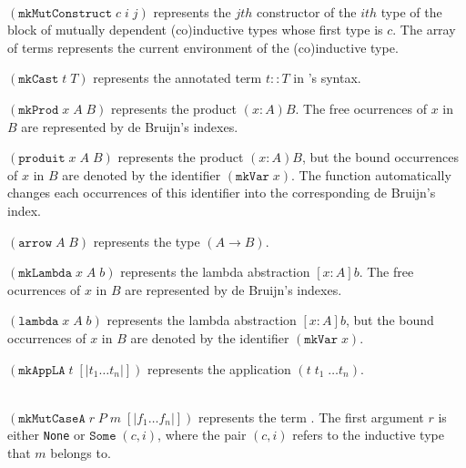\begin{description}
 {\\ $(\texttt{mkMutConstruct}\;c\;i\;j)$ represents the
    $jth$ constructor of the $ith$ type of the block of mutually
    dependent (co)inductive types whose first type is $c$. The array
    of terms represents the current environment of the (co)inductive
    type.}

    {$(\texttt{mkCast}\;t\;T)$ represents the annotated term $t::T$ in
    \Coq's syntax.}  

    {$(\texttt{mkProd}\;x\;A\;B)$ represents the product $(x:A)B$.
     The free ocurrences of $x$ in $B$ are represented by de Bruijn's
     indexes.}

    {$(\texttt{produit}\;x\;A\;B)$ represents the product $(x:A)B$,
     but the bound occurrences of $x$ in $B$ are denoted by 
     the identifier $(\texttt{mkVar}\;x)$. The function automatically 
     changes each occurrences of this identifier into the corresponding 
     de Bruijn's index.}

    {$(\texttt{arrow}\;A\;B)$ represents the type $(A\rightarrow B)$.}

    {$(\texttt{mkLambda}\;x\;A\;b)$ represents the lambda abstraction 
     $[x:A]b$. The free ocurrences of $x$ in $B$ are represented by de Bruijn's
     indexes.}

    {$(\texttt{lambda}\;x\;A\;b)$ represents the lambda abstraction 
     $[x:A]b$, but the bound occurrences of $x$ in $B$ are denoted by 
     the identifier $(\texttt{mkVar}\;x)$. }

    {$(\texttt{mkAppLA}\;t\;[|t_1\ldots t_n|])$ represents the application
    $(t\;t_1\;\ldots t_n)$.}

    {\\ $(\texttt{mkMutCaseA}\;r\;P\;m\;[|f_1\ldots f_n|])$
    represents the term . The first argument
    $r$ is either \texttt{None} or $\texttt{Some}\;(c,i)$, where the
    pair $(c,i)$ refers to the inductive type that $m$ belongs to.}


\end{description}
